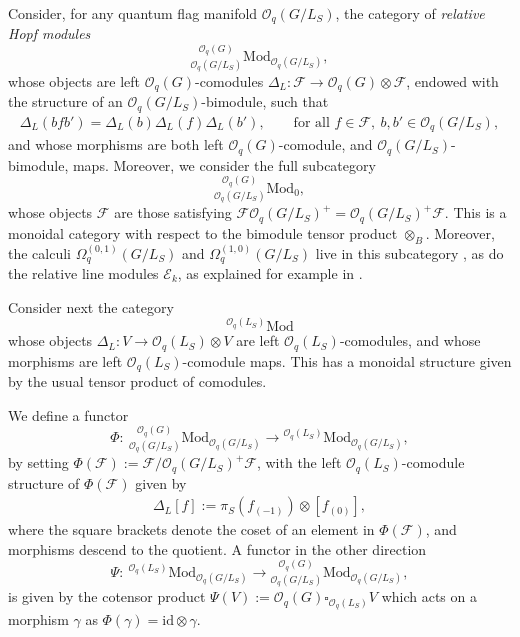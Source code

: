 \documentclass[pdftex]{sigma}
\numberwithin{equation}{section}
\begin{document}
Consider, for any quantum flag manifold $\mathcal{O}_q(G/L_S)$, the category of \emph{relative Hopf modules}
\[
{}^{~~~\,\mathcal{O}_q(G)}_{\mathcal{O}_q(G/L_S)}\mathrm{Mod}_{\mathcal{O}_q(G/L_S)},
\]
whose objects are left \mbox{$\mathcal{O}_q(G)$-comodules} $\Delta_L\colon \mathcal{F} \to \mathcal{O}_q(G) \otimes \mathcal{F}$, endowed with the structure of an $\mathcal{O}_q(G/L_S)$-bimodule, such that
\begin{gather*}
\Delta_L(bfb') = \Delta_L(b)\Delta_L(f)\Delta_L(b'), \qquad \textrm{for all } f \in \mathcal{F},\ b,b' \in \mathcal{O}_q(G/L_S),
\end{gather*}
and whose morphisms are both left $\mathcal{O}_q(G)$-comodule, and $\mathcal{O}_q(G/L_S)$-bimodule, maps. Moreover, we consider the full subcategory
\[
{}^{~~~\,\mathcal{O}_q(G)}_{\mathcal{O}_q(G/L_S)}\mathrm{Mod}_{0},
\]
whose objects $\mathcal{F}$ are those satisfying $\mathcal{F} \mathcal{O}_q(G/L_S)^+ = \mathcal{O}_q(G/L_S)^+\mathcal{F}$. This is a monoidal category with respect to the bimodule tensor product $\otimes_B$. Moreover, the calculi $\Omega^{(0,1)}_q(G/L_S)$ and $\Omega^{(1,0)}_q(G/L_S)$ live in this subcategory \cite[Proposition 3.3]{HKdR}, as do the relative line modules $\mathcal{E}_k$, as explained for example in \cite[Appendix A.3]{GAPP}.

Consider next the category
\[
{}^{\mathcal{O}_q(L_S)}\mathrm{Mod}
\]
whose objects $\Delta_L\colon V \to \mathcal{O}_q(L_S) \otimes V$ are left \mbox{$\mathcal{O}_q(L_S)$-comodules}, and whose morphisms are left $\mathcal{O}_q(L_S)$-comodule maps. This has a monoidal structure given by the usual tensor product of comodules.

We define a functor
\[
\Phi\colon \ {}^{~~~\,\mathcal{O}_q(G)}_{\mathcal{O}_q(G/L_S)}\mathrm{Mod}_{\mathcal{O}_q(G/L_S)} \to {}^{\mathcal{O}_q(L_S)}\mathrm{Mod}_{\mathcal{O}_q(G/L_S)},
\]
by setting $\Phi(\mathcal{F}) := \mathcal{F}/\mathcal{O}_q(G/L_S)^+\mathcal{F}$,
with the left $\mathcal{O}_q(L_S)$-comodule structure of $\Phi(\mathcal{\mathcal{F}})$ given by
\begin{gather*}
\Delta_L[f] := \pi_S(f_{(-1)})\otimes [f_{(0)}],
\end{gather*}
where the square brackets denote the coset of an element in $\Phi(\mathcal{\mathcal{F}})$, and morphisms descend to the quotient. A functor in the other direction
\[
\Psi\colon \ {}^{\mathcal{O}_q(L_S)}\mathrm{Mod}_{\mathcal{O}_q(G/L_S)} \to {}^{~~~\,\mathcal{O}_q(G)}_{\mathcal{O}_q(G/L_S)}\mathrm{Mod}_{\mathcal{O}_q(G/L_S)},
\]
is given by the cotensor product
$\Psi(V) := \mathcal{O}_q(G) \square_{\mathcal{O}_q(L_S)} V$
which acts on a morphism $\gamma$ as $\Phi(\gamma) = \mathrm{id} \otimes \gamma$.
\end{document}
